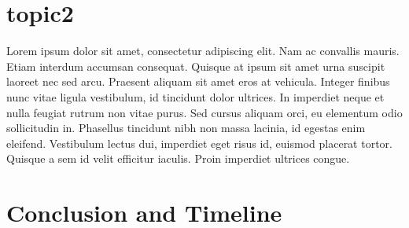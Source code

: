 \documentclass[oneside]{memoir}
\begin{document}
\section{topic2}
Lorem ipsum dolor sit amet, consectetur adipiscing elit. Nam ac convallis mauris. Etiam interdum accumsan consequat. Quisque at ipsum sit amet urna suscipit laoreet nec sed arcu. Praesent aliquam sit amet eros at vehicula. Integer finibus nunc vitae ligula vestibulum, id tincidunt dolor ultrices. In imperdiet neque et nulla feugiat rutrum non vitae purus. Sed cursus aliquam orci, eu elementum odio sollicitudin in. Phasellus tincidunt nibh non massa lacinia, id egestas enim eleifend. Vestibulum lectus dui, imperdiet eget risus id, euismod placerat tortor. Quisque a sem id velit efficitur iaculis. Proin imperdiet ultrices congue.

\section{Conclusion and Timeline}



\end{document}
